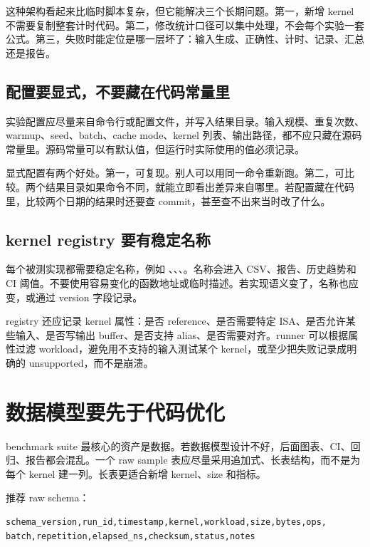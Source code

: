 这种架构看起来比临时脚本复杂，但它能解决三个长期问题。第一，新增 kernel 不需要复制整套计时代码。第二，修改统计口径可以集中处理，不会每个实验一套公式。第三，失败时能定位是哪一层坏了：输入生成、正确性、计时、记录、汇总还是报告。

\subsection{配置要显式，不要藏在代码常量里}

实验配置应尽量来自命令行或配置文件，并写入结果目录。输入规模、重复次数、warmup、seed、batch、cache mode、kernel 列表、输出路径，都不应只藏在源码常量里。源码常量可以有默认值，但运行时实际使用的值必须记录。

显式配置有两个好处。第一，可复现。别人可以用同一命令重新跑。第二，可比较。两个结果目录如果命令不同，就能立即看出差异来自哪里。若配置藏在代码里，比较两个日期的结果时还要查 commit，甚至查不出来当时改了什么。

\subsection{kernel registry 要有稳定名称}

每个被测实现都需要稳定名称，例如 、、、。名称会进入 CSV、报告、历史趋势和 CI 阈值。不要使用容易变化的函数地址或临时描述。若实现语义变了，名称也应变，或通过 version 字段记录。

registry 还应记录 kernel 属性：是否 reference、是否需要特定 ISA、是否允许某些输入、是否写输出 buffer、是否支持 alias、是否需要对齐。runner 可以根据属性过滤 workload，避免用不支持的输入测试某个 kernel，或至少把失败记录成明确的 unsupported，而不是崩溃。

\section{数据模型要先于代码优化}

benchmark suite 最核心的资产是数据。若数据模型设计不好，后面图表、CI、回归、报告都会混乱。一个 raw sample 表应尽量采用追加式、长表结构，而不是为每个 kernel 建一列。长表更适合新增 kernel、size 和指标。

推荐 raw schema：

\begin{lstlisting}
schema_version,run_id,timestamp,kernel,workload,size,bytes,ops,
batch,repetition,elapsed_ns,checksum,status,notes
\end{lstlisting}

